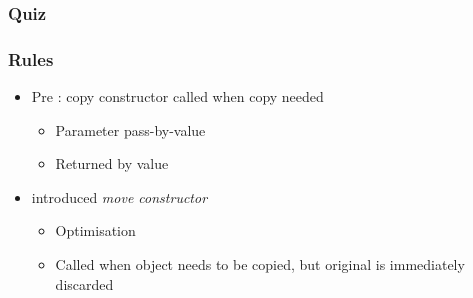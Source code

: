\documentclass{../ucll-slides}
\begin{document}
\begin{frame}
  \frametitle{Quiz}
  \vskip5mm
\end{frame}

\begin{frame}
  \frametitle{Rules}
  \begin{itemize}
    \item Pre : copy constructor called when copy needed
      \begin{itemize}
        \item Parameter pass-by-value
        \item Returned by value
      \end{itemize}
    \item {} introduced \emph{move constructor}
      \begin{itemize}
        \item Optimisation
        \item Called when object needs to be copied, but original is immediately discarded
      \end{itemize}
  \end{itemize}
\end{frame}

\end{document}

